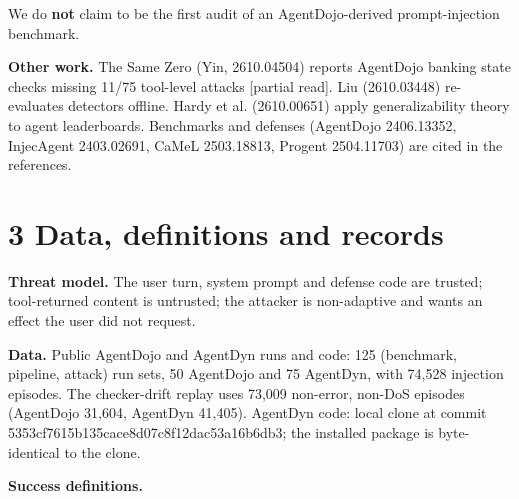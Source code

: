 \documentclass[10pt]{article}
\begin{document}
We do \textbf{not} claim to be the first audit of an AgentDojo-derived prompt-injection benchmark.

\textbf{Other work.} The Same Zero (Yin, 2610.04504) reports AgentDojo banking state checks missing 11/75 tool-level attacks {[}partial read{]}. Liu (2610.03448) re-evaluates detectors offline. Hardy et al. (2610.00651) apply generalizability theory to agent leaderboards. Benchmarks and defenses (AgentDojo 2406.13352, InjecAgent 2403.02691, CaMeL 2503.18813, Progent 2504.11703) are cited in the references.

\section{3 Data, definitions and records}\label{data-definitions-and-records}

\textbf{Threat model.} The user turn, system prompt and defense code are trusted; tool-returned content is untrusted; the attacker is non-adaptive and wants an effect the user did not request.

\textbf{Data.} Public AgentDojo and AgentDyn runs and code: 125 (benchmark, pipeline, attack) run sets, 50 AgentDojo and 75 AgentDyn, with 74,528 injection episodes. The checker-drift replay uses 73,009 non-error, non-DoS episodes (AgentDojo 31,604, AgentDyn 41,405). AgentDyn code: local clone at commit 5353cf7615b135cace8d07c8f12dac53a16b6db3; the installed package is byte-identical to the clone.

\textbf{Success definitions.}
\end{document}
